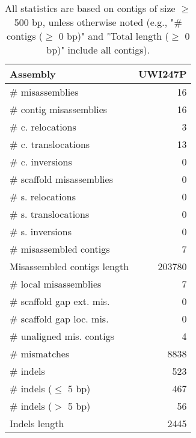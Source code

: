 \documentclass[12pt,a4paper]{article}
\begin{document}
\begin{table}[ht]
\begin{center}
\caption{All statistics are based on contigs of size $\geq$ 500 bp, unless otherwise noted (e.g., "\# contigs ($\geq$ 0 bp)" and "Total length ($\geq$ 0 bp)" include all contigs).}
\begin{tabular}{|l*{1}{|r}|}
\hline
Assembly & UWI247P \\ \hline
\# misassemblies & 16 \\ \hline
\hspace{2mm}\# contig misassemblies & 16 \\ \hline
\hspace{5mm}\# c. relocations & 3 \\ \hline
\hspace{5mm}\# c. translocations & 13 \\ \hline
\hspace{5mm}\# c. inversions & 0 \\ \hline
\hspace{2mm}\# scaffold misassemblies & 0 \\ \hline
\hspace{5mm}\# s. relocations & 0 \\ \hline
\hspace{5mm}\# s. translocations & 0 \\ \hline
\hspace{5mm}\# s. inversions & 0 \\ \hline
\# misassembled contigs & 7 \\ \hline
Misassembled contigs length & 203780 \\ \hline
\# local misassemblies & 7 \\ \hline
\# scaffold gap ext. mis. & 0 \\ \hline
\# scaffold gap loc. mis. & 0 \\ \hline
\# unaligned mis. contigs & 4 \\ \hline
\# mismatches & 8838 \\ \hline
\# indels & 523 \\ \hline
\hspace{5mm}\# indels ($\leq$ 5 bp) & 467 \\ \hline
\hspace{5mm}\# indels ($>$ 5 bp) & 56 \\ \hline
Indels length & 2445 \\ \hline
\end{tabular}
\end{center}
\end{table}
\end{document}
